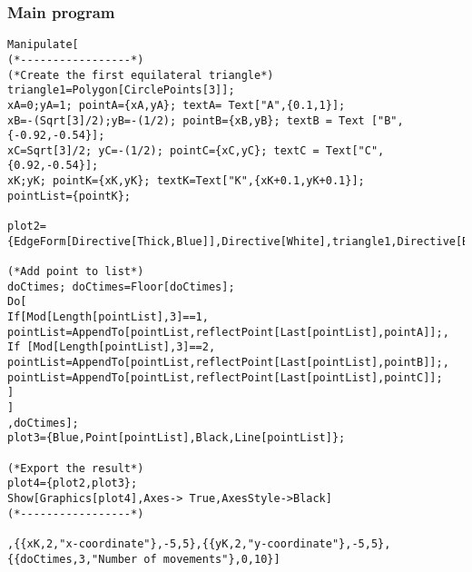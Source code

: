\documentclass[a4paper,11pt]{article}
\begin{document}
\subsubsection{Main program}

\lstset{language=Mathematica}
\begin{lstlisting}
Manipulate[
(*-----------------*)
(*Create the first equilateral triangle*)
triangle1=Polygon[CirclePoints[3]];
xA=0;yA=1; pointA={xA,yA}; textA= Text["A",{0.1,1}];
xB=-(Sqrt[3]/2);yB=-(1/2); pointB={xB,yB}; textB = Text ["B",{-0.92,-0.54}];
xC=Sqrt[3]/2; yC=-(1/2); pointC={xC,yC}; textC = Text["C",{0.92,-0.54}];
xK;yK; pointK={xK,yK}; textK=Text["K",{xK+0.1,yK+0.1}];
pointList={pointK};

plot2={EdgeForm[Directive[Thick,Blue]],Directive[White],triangle1,Directive[Black],Point[pointA],Point[pointB],Point[pointC],textA,textB,textC,PointSize[0.02],Point[pointK],textK};

(*Add point to list*)
doCtimes; doCtimes=Floor[doCtimes];
Do[
If[Mod[Length[pointList],3]==1,
pointList=AppendTo[pointList,reflectPoint[Last[pointList],pointA]];,
If [Mod[Length[pointList],3]==2,
pointList=AppendTo[pointList,reflectPoint[Last[pointList],pointB]];,
pointList=AppendTo[pointList,reflectPoint[Last[pointList],pointC]];
]
]
,doCtimes];
plot3={Blue,Point[pointList],Black,Line[pointList]};

(*Export the result*)
plot4={plot2,plot3};
Show[Graphics[plot4],Axes-> True,AxesStyle->Black]
(*-----------------*)

,{{xK,2,"x-coordinate"},-5,5},{{yK,2,"y-coordinate"},-5,5},{{doCtimes,3,"Number of movements"},0,10}]
\end{lstlisting}
\end{document}
